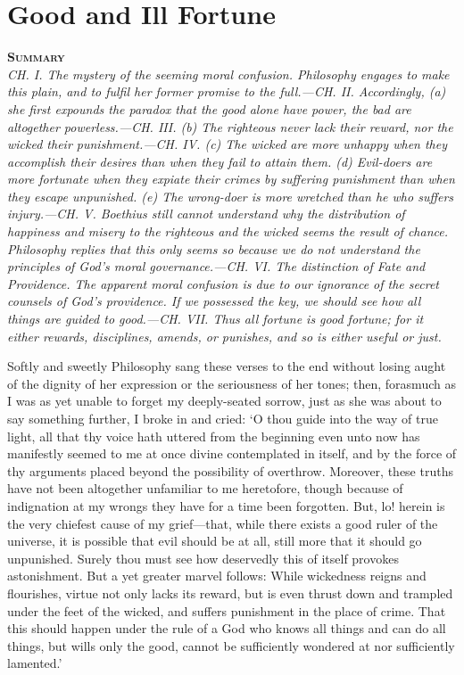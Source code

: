 \documentclass[11pt]{book}
\newenvironment{abstract}%
  {\noindent \textbf{\scshape Summary} \\ \rightskip1in\itshape\small}%
  {\bigskip}
\begin{document}

\chapter{Good and Ill Fortune}

\begin{abstract}
     CH. I. The mystery of the seeming moral confusion. Philosophy
     engages to make this plain, and to fulfil her former promise to the
     full.---CH. II. Accordingly, (a) she first expounds the paradox that
     the good alone have power, the bad are altogether powerless.---CH.
     III. (b) The righteous never lack their reward, nor the wicked
     their punishment.---CH. IV. (c) The wicked are more unhappy when
     they accomplish their desires than when they fail to attain them.
     (d) Evil-doers are more fortunate when they expiate their crimes by
     suffering punishment than when they escape unpunished. (e) The
     wrong-doer is more wretched than he who suffers injury.---CH. V.
     Boethius still cannot understand why the distribution of happiness
     and misery to the righteous and the wicked seems the result of
     chance. Philosophy replies that this only seems so because we do
     not understand the principles of God's moral governance.---CH. VI.
     The distinction of Fate and Providence. The apparent moral
     confusion is due to our ignorance of the secret counsels of God's
     providence. If we possessed the key, we should see how all things
     are guided to good.---CH. VII. Thus all fortune is good fortune; for
     it either rewards, disciplines, amends, or punishes, and so is
     either useful or just.
\end{abstract}


Softly and sweetly Philosophy sang these verses to the end without
losing aught of the dignity of her expression or the seriousness of her
tones; then, forasmuch as I was as yet unable to forget my deeply-seated
sorrow, just as she was about to say something further, I broke in and
cried: `O thou guide into the way of true light, all that thy voice hath
uttered from the beginning even unto now has manifestly seemed to me at
once divine contemplated in itself, and by the force of thy arguments
placed beyond the possibility of overthrow. Moreover, these truths have
not been altogether unfamiliar to me heretofore, though because of
indignation at my wrongs they have for a time been forgotten. But, lo!
herein is the very chiefest cause of my grief---that, while there exists
a good ruler of the universe, it is possible that evil should be at all,
still more that it should go unpunished. Surely thou must see how
deservedly this of itself provokes astonishment. But a yet greater
marvel follows: While wickedness reigns and flourishes, virtue not only
lacks its reward, but is even thrust down and trampled under the feet of
the wicked, and suffers punishment in the place of crime. That this
should happen under the rule of a God who knows all things and can do
all things, but wills only the good, cannot be sufficiently wondered at
nor sufficiently lamented.'
\end{document}
